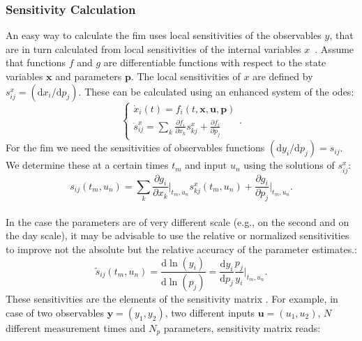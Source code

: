 \documentclass[10pt,A4paper]{article}
\newcommand{\mbx}{\mathbf{x}}
\newcommand{\mbu}{\mathbf{u}}
\newcommand{\mbp}{\mathbf{p}}
\newcommand{\mby}{\mathbf{y}}
\begin{document}
\subsubsection*{Sensitivity Calculation}
An easy way to calculate the \ac{fim} uses local sensitivities of the observables $y$, that are in turn calculated from local sensitivities of the internal variables $x$~\cite{versyckIntroducingOptimal1999, banks_generalized_2010}.
Assume that functions $f$ and $g$ are differentiable functions with respect to the state variables $\mbx$ and parameters $\mbp$.
The local sensitivities of $x$ are defined by $s^x_{ij} = (\mathrm{d} x_i / \mathrm{d} p_j )$.
These can be calculated using an enhanced system of the \acp{ode}:
\begin{equation}
    \begin{cases}
    \dot x_i (t) = f_i(t, \mbx, \mbu, \mbp)\\
    \dot s^x_{ij} = \sum_k \frac{\partial f_i}{\partial x_k} s^x_{kj} + \frac{\partial f_i}{\partial p_j}
    \end{cases}.
\label{eq:ode_and_sensitiv}
\end{equation}
For the \ac{fim} we need the sensitivities of observables functions $(\mathrm{d} y_i / \mathrm{d} p_j) = s_{ij}$.
We determine these at a certain times $t_m$ and input $u_n$ using the solutions of $s^x_{ij}$:
\begin{equation}
    s_{ij} (t_m, u_n) = \sum_k \frac{\partial g_i}{\partial x_k}\bigg|_{t_m, u_n} s_{kj}^x (t_m, u_n) + \frac{\partial g_i}{\partial p_j}\bigg|_{t_m, u_n}.
\label{eq:observ_sensitivities}
\end{equation}
\\
In the case the parameters are of very different scale (e.g., on the second and on the day scale), it may be advisable to use the relative or normalized sensitivities to improve not the absolute but the relative accuracy of the parameter estimates.:
\begin{equation}
    \tilde{s}_{ij} (t_m, u_n) =\frac{\mathrm{d}\ln(y_i)}{\mathrm{d}\ln(p_j)} = \frac{\mathrm{d} y_i}{\mathrm{d} p_j} \frac{p_j}{y_i}\bigg|_{t_m, u_n}.
\label{eq:relat_sensitivities}
\end{equation}
These sensitivities are the elements of the sensitivity matrix \cite{stigterObservabilityComplex2017}.
For example, in case of two observables $\mby = (y_1, y_2)$, two different inputs $\mbu = (u_1, u_2)$, $N$ different measurement times and $N_p$ parameters, sensitivity matrix reads:
\end{document}
